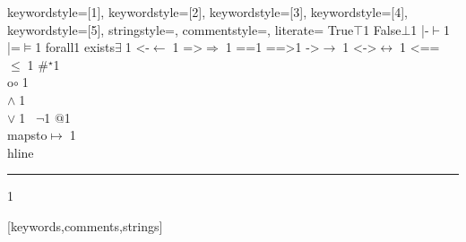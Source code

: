 {%
keywordstyle=[1]{\ttfamily\bfseries\color{dkviolet}},
keywordstyle=[2]{\ttfamily\bfseries\color{dkgreen}},
keywordstyle=[3]{\ttfamily\bfseries\color{ltblue}},
keywordstyle=[4]{\ttfamily\color{dkblue}},
keywordstyle=[5]{\ttfamily\color{dkred}},
stringstyle=\ttfamily,
commentstyle={\ttfamily\itshape\color{dkgreen}},%
literate=
	{True}{{$\top$}}1
{False}{{$\bot$}}1
{|-}{{$\vdash$}}1
{|=}{{$\vDash$}}1
{forall}{{\color{dkgreen}{$\forall\;$}}}1
{exists}{{$\exists\;$}}1
{<-}{{$\leftarrow\;$}}1
{=>}{{$\Rightarrow\;$}}1
{==}{{\code{==}\;}}1
{==>}{{\code{==>}\;}}1
{->}{{$\rightarrow\;$}}1
{<->}{{$\leftrightarrow\;$}}1
{<==}{{$\leq\;$}}1
{\#}{{$^\star$}}1
{\\o}{{$\circ\;$}}1
{\/\\}{{$\wedge\;$}}1
{\\\/}{{$\vee\;$}}1
{~}{{$\lnot$}}1
{\@\@}{{$@$}}1
{\\mapsto}{{$\mapsto\;$}}1
{\\hline}{{\rule{\linewidth}{0.5pt}}}1
%
}[keywords,comments,strings]


\def\coqe{\lstinline[language=coq, basicstyle=\small]}
% pour inliner dans les tableaux / displaymath...
\def\coqes{\lstinline[language=coq, basicstyle=\scriptsize]}
